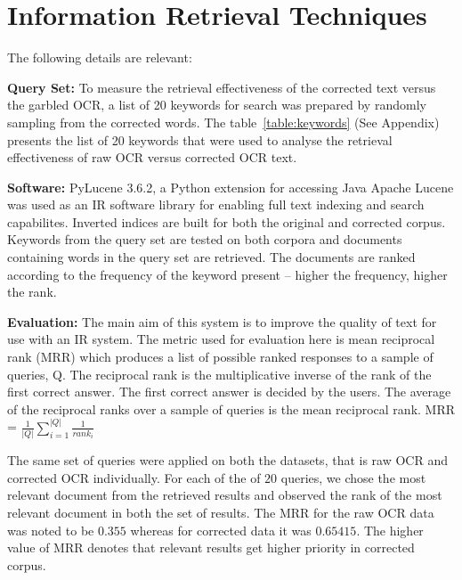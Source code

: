 \documentclass{sig-alternate}
\begin{document}
\section{Information Retrieval Techniques}
\label{ir}
The following details are relevant: 

\noindent \textbf{Query Set:} To measure the retrieval effectiveness of the corrected text versus the garbled OCR, a list of 20 keywords for search was prepared by randomly sampling from the corrected words. The table~\ref{table:keywords} (See Appendix) presents the list of 20 keywords that were used to analyse the retrieval effectiveness of raw OCR versus corrected OCR text.

\noindent \textbf{Software:} PyLucene 3.6.2, a Python extension for accessing Java Apache Lucene was used as an IR software library for enabling full text indexing and search capabilites. Inverted indices are built for both the original and corrected corpus. Keywords from the query set are tested on both corpora and documents containing words in the query set are retrieved. The documents are ranked according to the frequency of the keyword present -- higher the frequency, higher the rank.

\noindent \textbf{Evaluation:} The main aim of this system is to improve the quality of text for use with an IR system. The metric used for evaluation here is mean reciprocal rank (MRR) which produces a list of possible ranked responses to a sample of queries, Q. The reciprocal rank is the multiplicative inverse of the rank of the first correct answer. The first correct answer is decided by the users. The average of the reciprocal ranks over a sample of queries is the mean reciprocal rank.
MRR = $\frac{1}{|Q|} \sum_{i = 1}^{|Q|} \frac{1}{rank_{i}}$

The same set of queries were applied on both the datasets, that is raw OCR and corrected OCR individually. For each of the of $20$ queries, we chose the most relevant document from the retrieved results and observed the rank of the most relevant document in both the set of results. The MRR for the raw OCR data was noted to be $0.355$ whereas for corrected data it was $0.65415$. The higher value of MRR denotes that relevant results get higher priority in corrected corpus.

 
\end{document}
